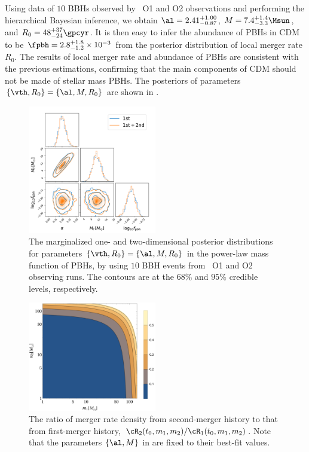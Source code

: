 \documentclass[
reprint,           %
superscriptaddress,%
amsmath,           %
amssymb,           %
aps,               %
prd,               %
notitlepage,       %
longbibliography,  %
floatfix,          %
showkeys,          %
]{revtex4-1}
\begin{document}
Using data of $10$ BBHs observed by \lvc\ O1 and O2 observations and performing
the hierarchical Bayesian inference, we obtain $\al = 2.41^{+1.00}_{-0.87}$,
$M = 7.4^{+1.4}_{-3.3} \Msun$, and $R_0 = 48^{+37}_{-24} \gpcyr$.
It is then easy to infer the abundance of PBHs in CDM to be 
$\fpbh = 2.8^{+1.8}_{-1.2} \times 10^{-3}$ from the posterior distribution of local merger rate $R_0$.
The results of local merger rate and abundance of PBHs are consistent with
the previous estimations, confirming that the main components of CDM should
not be made of stellar mass PBHs.
The posteriors of parameters $\{\vth, R_0\} = \{\al, M, R_0\}$ are shown 
in .

\begin{figure}[htbp!]
	\centering
	\includegraphics[width=0.5\textwidth]{post-CC.pdf}
	\caption{\label{post-CC}
		The marginalized one- and two-dimensional posterior distributions for 
		parameters $\{\vth, R_0\} = \{\al, M, R_0\}$ in the power-law mass function 
		of PBHs, by using $10$ BBH events from \lvc\ O1 and O2 observing runs.
		The contours are at the $68\%$ and $95\%$ credible levels, respectively. 
	}
\end{figure}

\begin{figure}[htbp!]
	\centering
	\includegraphics[width=0.5\textwidth]{ratio-CC.pdf}
	\caption{\label{ratio-CC}
		The ratio of merger rate density from second-merger history
		to that from first-merger history,
		$\cR_2(t_0, m_1, m_2)/\cR_1(t_0, m_1, m_2)$. Note that the parameters $\{\al, M\}$ in  are fixed to their best-fit values.
	}
\end{figure}
\end{document}
